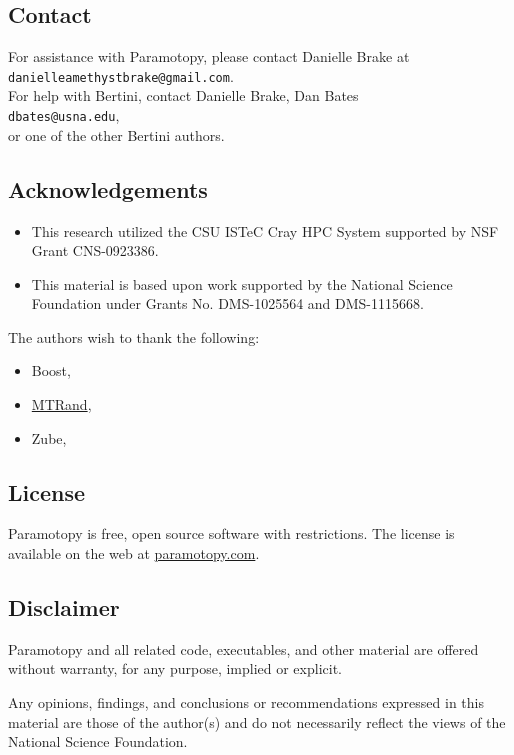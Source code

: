 \subsection{Contact}
\label{sec:contact}
For assistance with Paramotopy, please contact Danielle Brake at \\
\texttt{danielleamethystbrake@gmail.com}.  \\For help with Bertini, contact Danielle Brake, Dan Bates \\
\texttt{dbates@usna.edu}, \\or one of the other Bertini authors.

\subsection*{Acknowledgements}
\begin{itemize}
\item  This research utilized the CSU ISTeC Cray HPC System supported by NSF Grant CNS-0923386.
\item  This material is based upon work supported by the National Science Foundation under Grants No. DMS-1025564 and DMS-1115668.
\end{itemize}

The authors wish to thank the following:
\begin{itemize}
	\item Boost,
	\item \href{http://www.bedaux.net/mtrand/}{MTRand},
	\item Zube,
\end{itemize}

\clearpage
\subsection{License}
\label{sec:license}
Paramotopy is free, open source software with restrictions.  The license is available on the web at \href{http://www.paramotopy.com/resources/programs/paramotopy_license.txt}{paramotopy.com}.

\subsection*{Disclaimer}
Paramotopy and all related code, executables, and other material are offered without warranty, for any purpose, implied or explicit. 

Any opinions, findings, and conclusions or recommendations expressed in this material are those of the author(s) and do not necessarily reflect the views of the National Science Foundation.




